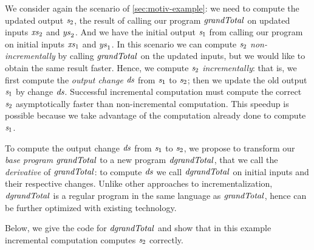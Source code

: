 We consider again the scenario of \cref{sec:motiv-example}: we need to compute
the updated output \ensuremath{\Varid{s}_{2}}, the result of calling our program \ensuremath{\Varid{grandTotal}} on
updated inputs \ensuremath{\Varid{xs}_{2}} and \ensuremath{\Varid{ys}_{2}}. And we have the initial output \ensuremath{\Varid{s}_{1}} from calling our
program on initial inputs \ensuremath{\Varid{xs}_{1}} and \ensuremath{\Varid{ys}_{1}}. In this scenario we can compute \ensuremath{\Varid{s}_{2}}
\emph{non-incrementally} by calling \ensuremath{\Varid{grandTotal}} on the updated inputs, but
we would like to obtain the same result faster.
Hence, we compute \ensuremath{\Varid{s}_{2}} \emph{incrementally}: that is, we first compute the
\emph{output change} \ensuremath{\Varid{ds}} from \ensuremath{\Varid{s}_{1}} to \ensuremath{\Varid{s}_{2}}; then we update the old output \ensuremath{\Varid{s}_{1}}
by change \ensuremath{\Varid{ds}}. Successful incremental computation must compute the correct \ensuremath{\Varid{s}_{2}}
asymptotically faster than non-incremental computation. This speedup is possible
because we take advantage of the computation already done to compute \ensuremath{\Varid{s}_{1}}.

To compute the output change \ensuremath{\Varid{ds}} from \ensuremath{\Varid{s}_{1}} to \ensuremath{\Varid{s}_{2}}, we propose to transform our
\emph{base program} \ensuremath{\Varid{grandTotal}} to a new program \ensuremath{\Varid{dgrandTotal}}, that we call
the \emph{derivative} of \ensuremath{\Varid{grandTotal}}: to compute \ensuremath{\Varid{ds}} we call \ensuremath{\Varid{dgrandTotal}}
on initial inputs and their respective changes.
Unlike other approaches to incrementalization, \ensuremath{\Varid{dgrandTotal}} is a regular
program in the same language as \ensuremath{\Varid{grandTotal}}, hence can be further optimized
with existing technology.

Below, we give the code for \ensuremath{\Varid{dgrandTotal}} and show that in this example
incremental computation computes \ensuremath{\Varid{s}_{2}} correctly.

